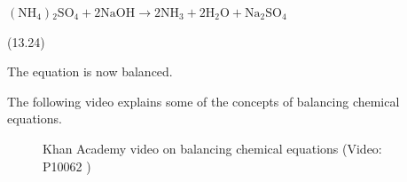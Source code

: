 {\begin{mdframed}[linewidth=4, leftmargin=40, rightmargin=40]
\begin{exercise}
\begin{enumerate}[noitemsep, label=\textbf{Step} \textbf{\arabic*}. ]
{\begin{equation}
      \end{equation}
    }{%
    \setlength{\mymathboxwidth}{\columnwidth}
      \addtolength{\mymathboxwidth}{-48pt}
    \par\vspace{12pt}\noindent\begin{minipage}{\columnwidth}
    \parbox[t]{\mymathboxwidth}{\large\begin{math}
    \left({\mathrm{NH}}_{4}\right){}_{2}{\mathrm{SO}}_{4}+2\mathrm{NaOH}\to 2\mathrm{NH}{}_{3}+2\mathrm{H}{}_{2}\mathrm{O}+\mathrm{Na}{}_{2}{\mathrm{SO}}_{4}\end{math}}\hfill
    \parbox[t]{48pt}{\raggedleft 
    (13.24)}
    \end{minipage}\vspace{12pt}\par
    }%
    
      \par 
      \label{m38727*id66774}The equation is now balanced.\par 
\end{enumerate}
         

    \end{exercise}
    \end{mdframed}
    }
    \noindent
  
\label{m38727*eip-44}The following video explains some of the concepts of balancing chemical equations.\newline
    

    \setcounter{subfigure}{0}


	\begin{figure}[H] %
    
    
    \textnormal{Khan Academy video on balancing chemical equations}\vspace{.1in} \nopagebreak
  \label{m38727*yt-media1}\label{m38727*yt-video1}
             { (Video:  P10062 )}
      
      \vspace{2pt}
    \vspace{.1in}
    
    

 \end{figure}   

